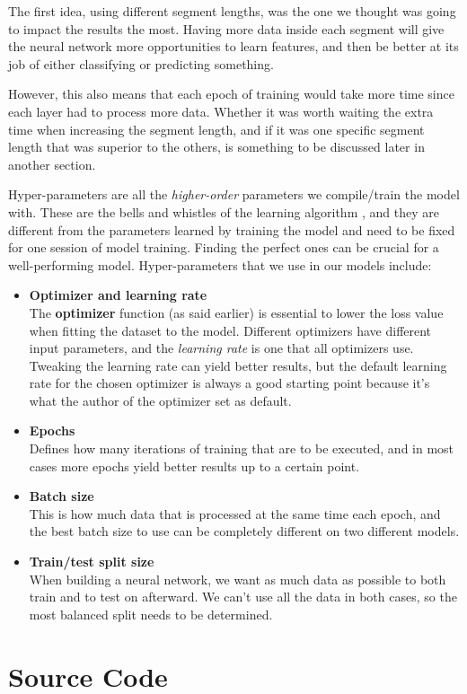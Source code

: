 \noindent The first idea, using different segment lengths, was the one we thought was going to impact the results the most. Having more data inside each segment will give the neural network more opportunities to learn features, and then be better at its job of either classifying or predicting something. 

However, this also means that each epoch of training would take more time since each layer had to process more data. Whether it was worth waiting the extra time when increasing the segment length, and if it was one specific segment length that was superior to the others, is something to be discussed later in another section. 

Hyper-parameters are all the \textit{higher-order} parameters we compile/train the model with. These are the bells and whistles of the learning algorithm \cite{hyperparameters}, and they are different from the parameters learned by training the model and need to be fixed for one session of model training. Finding the perfect ones can be crucial for a well-performing model. Hyper-parameters that we use in our models include:

\begin{itemize}
      \item \textbf{Optimizer and learning rate}\\
          The \textbf{optimizer} function (as said earlier) is essential to lower the loss value when fitting the dataset to the model. 
          Different optimizers have different input parameters, and the \textit{learning rate} is one that all optimizers use. 
          Tweaking the learning rate can yield better results, but the default learning rate for the chosen optimizer is always a good starting point because it's what the author of the optimizer set as default.
      \item \textbf{Epochs}\\
          Defines how many iterations of training that are to be executed, and in most cases more epochs yield better results up to a certain point.
      \item \textbf{Batch size}\\
          This is how much data that is processed at the same time each epoch, and the best batch size to use can be completely different on two different models. 
      \item \textbf{Train/test split size}\\
          When building a neural network, we want as much data as possible to both train and to test on afterward. We can't use all the data in both cases, so the most balanced split needs to be determined.
\end{itemize}

\section{Source Code}


